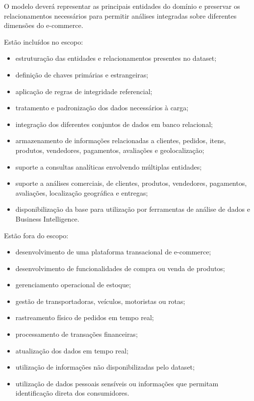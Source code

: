 \documentclass[12pt,a4paper]{article}
\begin{document}
O modelo deverá representar as principais entidades do domínio e preservar os relacionamentos necessários para permitir análises integradas sobre diferentes dimensões do e-commerce.

Estão incluídos no escopo:

\begin{itemize}
    \item estruturação das entidades e relacionamentos presentes no dataset;
    \item definição de chaves primárias e estrangeiras;
    \item aplicação de regras de integridade referencial;
    \item tratamento e padronização dos dados necessários à carga;
    \item integração dos diferentes conjuntos de dados em banco relacional;
    \item armazenamento de informações relacionadas a clientes, pedidos, itens, produtos, vendedores, pagamentos, avaliações e geolocalização;
    \item suporte a consultas analíticas envolvendo múltiplas entidades;
    \item suporte a análises comerciais, de clientes, produtos, vendedores, pagamentos, avaliações, localização geográfica e entregas;
    \item disponibilização da base para utilização por ferramentas de análise de dados e Business Intelligence.
\end{itemize}

Estão fora do escopo:

\begin{itemize}
    \item desenvolvimento de uma plataforma transacional de e-commerce;
    \item desenvolvimento de funcionalidades de compra ou venda de produtos;
    \item gerenciamento operacional de estoque;
    \item gestão de transportadoras, veículos, motoristas ou rotas;
    \item rastreamento físico de pedidos em tempo real;
    \item processamento de transações financeiras;
    \item atualização dos dados em tempo real;
    \item utilização de informações não disponibilizadas pelo dataset;
    \item utilização de dados pessoais sensíveis ou informações que permitam identificação direta dos consumidores.
\end{itemize}
\end{document}

